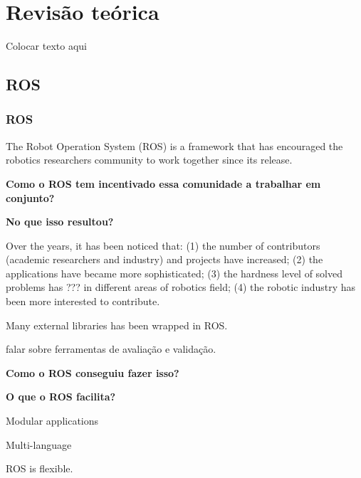 \chapter[Revisão teórica]{Revisão teórica} \label{cap:cap1}
Colocar texto aqui 

\section{ROS} \label{sec:sec1_1}

\subsection{ROS}

The Robot Operation System (ROS) \cite{ref:quigley2009ros} is a framework that has encouraged the robotics researchers community to work together since its release. 

\textbf{Como o ROS tem incentivado essa comunidade a trabalhar em conjunto?}

\textbf{No que isso resultou?}

Over the years, it has been noticed that:
	(1) the number of contributors (academic researchers and industry) and projects have increased;
	(2) the applications have became more sophisticated;
	(3) the hardness level of solved problems has ??? in different areas of robotics field;
	(4) the robotic industry has been more interested to contribute.

Many external libraries has been wrapped in ROS.


falar sobre ferramentas de avaliação e validação.

\textbf{Como o ROS conseguiu fazer isso?}


\textbf{O que o ROS facilita?}

Modular applications

Multi-language

ROS is flexible. 

